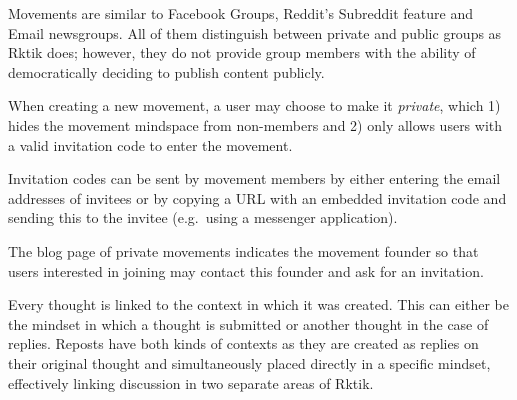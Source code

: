 Movements are similar to Facebook Groups, Reddit's Subreddit feature and
Email newsgroups. All of them distinguish between private and public
groups as Rktik does; however, they do not provide group members with
the ability of democratically deciding to publish content publicly.


When creating a new movement, a user may choose to make it
\emph{private}, which 1) hides the movement mindspace from non-members
and 2) only allows users with a valid invitation code to enter the
movement.

Invitation codes can be sent by movement members by either entering the
email addresses of invitees or by copying a URL with an embedded
invitation code and sending this to the invitee (e.g.~using a messenger
application).

The blog page of private movements indicates the movement founder so
that users interested in joining may contact this founder and ask for an
invitation.


Every thought is linked to the context in which it was created. This can
either be the mindset in which a thought is submitted or another thought
in the case of replies. Reposts have both kinds of contexts as they are
created as replies on their original thought and simultaneously placed
directly in a specific mindset, effectively linking discussion in two
separate areas of Rktik.

